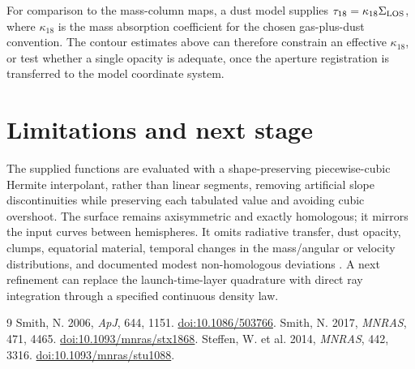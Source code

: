 \documentclass[11pt,a4paper]{article}
\begin{document}
For comparison to the mass-column maps, a dust model supplies $\tau_{18}=\kappa_{18}\Sigma_{\rm LOS}$, where $\kappa_{18}$ is the mass absorption coefficient for the chosen gas-plus-dust convention. The contour estimates above can therefore constrain an effective $\kappa_{18}$, or test whether a single opacity is adequate, once the aperture registration is transferred to the model coordinate system.

\section{Limitations and next stage}
The supplied functions are evaluated with a shape-preserving piecewise-cubic Hermite interpolant, rather than linear segments, removing artificial slope discontinuities while preserving each tabulated value and avoiding cubic overshoot. The surface remains axisymmetric and exactly homologous; it mirrors the input curves between hemispheres. It omits radiative transfer, dust opacity, clumps, equatorial material, temporal changes in the mass/angular or velocity distributions, and documented modest non-homologous deviations \cite{steffen2014}. A next refinement can replace the launch-time-layer quadrature with direct ray integration through a specified continuous density law.

\begin{thebibliography}{9}
 Smith, N. 2006, \emph{ApJ}, 644, 1151. \href{https://doi.org/10.1086/503766}{doi:10.1086/503766}.
 Smith, N. 2017, \emph{MNRAS}, 471, 4465. \href{https://doi.org/10.1093/mnras/stx1868}{doi:10.1093/mnras/stx1868}.
 Steffen, W. et al. 2014, \emph{MNRAS}, 442, 3316. \href{https://doi.org/10.1093/mnras/stu1088}{doi:10.1093/mnras/stu1088}.
\end{thebibliography}
\end{document}
